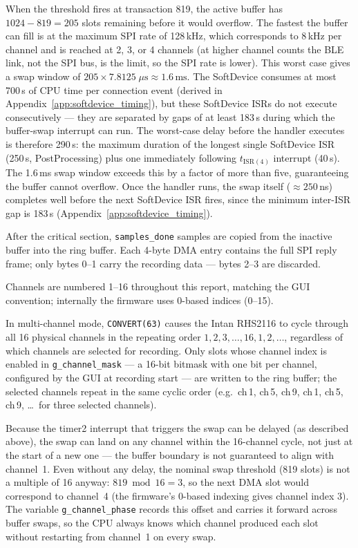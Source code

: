When the threshold fires at transaction 819, the active buffer has
$1024 - 819 = 205$ slots remaining before it would overflow. The fastest the
buffer can fill is at the maximum SPI rate of 128\,kHz, which corresponds to
8\,kHz per channel and is reached at 2, 3, or 4 channels (at higher channel counts
the BLE link, not the SPI bus, is the limit, so the SPI rate is lower). This worst
case gives a swap window of $205 \times 7.8125\;\mu\text{s} \approx 1.6\,\text{ms}$.
The SoftDevice consumes at most 700\,\textmu{}s of CPU time per connection event
(derived in Appendix~\ref{app:softdevice_timing}), but these SoftDevice ISRs do not execute
consecutively --- they are separated by gaps of at least 183\,\textmu{}s during
which the buffer-swap interrupt can run. The worst-case delay before the
handler executes is therefore 290\,\textmu{}s: the maximum duration of the longest
single SoftDevice ISR (250\,\textmu{}s, PostProcessing) plus one immediately
following $t_{\text{ISR}(4)}$ interrupt (40\,\textmu{}s). The 1.6\,ms swap window
exceeds this by a factor of more than five, guaranteeing the buffer cannot overflow.
Once the handler runs, the swap itself ($\approx 250$\,ns) completes well before
the next SoftDevice ISR fires, since the minimum inter-ISR gap is 183\,\textmu{}s
(Appendix~\ref{app:softdevice_timing}).

After the critical section, \texttt{samples\_done} samples are copied from the
inactive buffer into the ring buffer. Each 4-byte DMA entry contains the full
SPI reply frame; only bytes 0--1 carry the recording data --- bytes 2--3 are discarded.

Channels are numbered 1--16 throughout this report, matching the GUI convention;
internally the firmware uses 0-based indices (0--15).

In multi-channel mode, \texttt{CONVERT(63)} causes the Intan RHS2116 to cycle
through all 16 physical channels in the repeating order
$1, 2, 3, \ldots, 16, 1, 2, \ldots$, regardless of which channels are
selected for recording. Only slots whose channel index is enabled in
\texttt{g\_channel\_mask} --- a 16-bit bitmask with one bit per channel,
configured by the GUI at recording start --- are written to the ring buffer;
the selected channels repeat in the same cyclic order
(e.g.\ ch\,1, ch\,5, ch\,9, ch\,1, ch\,5, ch\,9, \ldots\ for three selected channels).

Because the timer2 interrupt that triggers the swap can be delayed (as described
above), the swap can land on any channel within the 16-channel cycle, not just at
the start of a new one --- the buffer boundary is not guaranteed to align with
channel~1. Even without any delay, the nominal swap threshold (819 slots) is not a
multiple of 16 anyway: $819 \bmod 16 = 3$, so the next DMA slot would correspond to
channel~4 (the firmware's 0-based indexing gives channel index 3). The variable
\texttt{g\_channel\_phase} records this offset and carries it forward across
buffer swaps, so the CPU always knows which channel produced each slot without
restarting from channel~1 on every swap.

